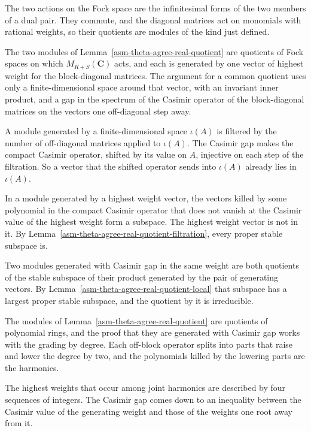 The two actions on the Fock space are the infinitesimal forms of the two
members of a dual pair. They commute, and the diagonal matrices act on
monomials with rational weights, so their quotients are modules of the kind
just defined.

The two modules of Lemma~\ref{asm-theta-agree-real-quotient} are quotients of
Fock spaces on which $M_{R+S}(\mathbf C)$ acts, and each is generated by one
vector of highest weight for the block-diagonal matrices. The argument for a
common quotient uses only a finite-dimensional space around that vector, with
an invariant inner product, and a gap in the spectrum of the Casimir operator
of the block-diagonal matrices on the vectors one off-diagonal step away.

A module generated by a finite-dimensional space $\iota(A)$ is filtered by the
number of off-diagonal matrices applied to $\iota(A)$. The Casimir gap makes
the compact Casimir operator, shifted by its value on $A$, injective on each
step of the filtration. So a vector that the shifted operator sends into
$\iota(A)$ already lies in $\iota(A)$.

In a module generated by a highest weight vector, the vectors killed by some
polynomial in the compact Casimir operator that does not vanish at the
Casimir value of the highest weight form a subspace. The highest weight vector
is not in it. By Lemma~\ref{asm-theta-agree-real-quotient-filtration}, every
proper stable subspace is.

Two modules generated with Casimir gap in the same weight are both quotients
of the stable subspace of their product generated by the pair of generating
vectors. By Lemma~\ref{asm-theta-agree-real-quotient-local} that subspace has
a largest proper stable subspace, and the quotient by it is irreducible.

The modules of Lemma~\ref{asm-theta-agree-real-quotient} are quotients of
polynomial rings, and the proof that they are generated with Casimir gap works
with the grading by degree. Each off-block operator splits into parts that
raise and lower the degree by two, and the polynomials killed by the lowering
parts are the harmonics.

The highest weights that occur among joint harmonics are described by four
sequences of integers. The Casimir gap comes down to an inequality between the
Casimir value of the generating weight and those of the weights one root away
from it.

